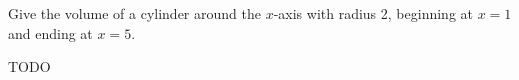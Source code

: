 \begin{exercise}
	Give the volume of a cylinder around the $x$-axis with radius 2, beginning at $x=1$ and ending at $x=5$.
\end{exercise}

\begin{solution}
	TODO
\end{solution}
